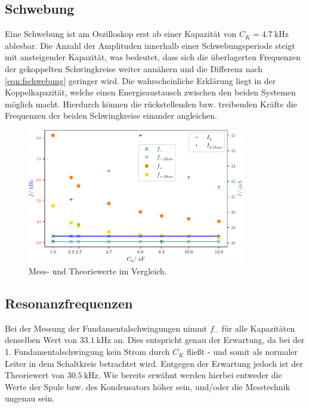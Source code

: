 \subsection{Schwebung}
Eine Schwebung ist am Oszilloskop erst ab einer Kapazität von $C_K = \SI{4.7}{\kilo\hertz}$ ablesbar. Die Anzahl der Amplituden innerhalb einer Schwebungsperiode
steigt mit ansteigender Kapazität, was bedeutet, dass sich die überlagerten Frequenzen der gekoppelten Schwingkreise weiter annähern und die Differenz nach \eqref{eqn:fschwebung} geringer wird.
Die wahrscheinliche Erklärung liegt in der Koppelkapazität, welche einen Energieaustausch zwischen den beiden Systemen möglich macht. Hierdurch können die rückstellenden bzw. treibenden Kräfte
die Frequenzen der beiden Schwingkreise einander angleichen.

\begin{figure}
    \centering
    \includegraphics[width=0.85\textwidth]{plots/Messdaten_und_Theorie.pdf}
    \caption{Mess- und Theoriewerte im Vergleich.}
    \label{fig:mess_theo}
\end{figure}

\subsection{Resonanzfrequenzen}
Bei der Messung der Fundamentalschwingungen nimmt $f_-$ für alle Kapazitäten denselben Wert von $\SI{33.1}{\kilo\hertz}$ an. Dies entspricht genau der Erwartung,
da bei der 1. Fundamentalschwingung kein Strom durch $C_K$ fließt - und somit als normaler Leiter in dem Schaltkreis betrachtet wird.
Entgegen der Erwartung jedoch ist der Theoriewert von $\SI{30.5}{\kilo\hertz}$. Wie bereits erwähnt werden hierbei entweder die Werte der Spule bzw. des Kondensators höher sein, und/oder
die Messtechnik ungenau sein.

